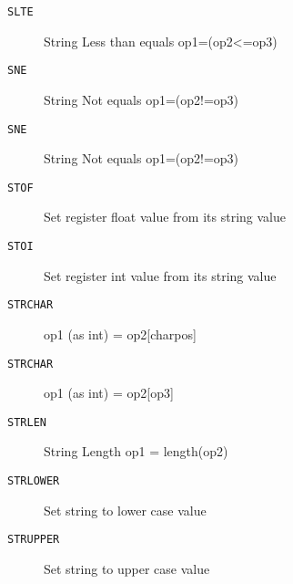 \begin{description}
\item[\texttt{SLTE}]  String Less than equals op1=(op2<=op3)\\

\end{description}
\begin{description}
\item[\texttt{SNE}]  String Not equals op1=(op2!=op3)\\

\end{description}
\begin{description}
\item[\texttt{SNE}]  String Not equals op1=(op2!=op3)\\

\end{description}
\begin{description}
\item[\texttt{STOF}]  Set register float value from its string value\\

\end{description}
\begin{description}
\item[\texttt{STOI}]  Set register int value from its string value\\

\end{description}
\begin{description}
\item[\texttt{STRCHAR}]  op1 (as int) = op2[charpos]\\

\end{description}
\begin{description}
\item[\texttt{STRCHAR}]  op1 (as int) = op2[op3]\\

\end{description}
\begin{description}
\item[\texttt{STRLEN}]  String Length op1 = length(op2)\\

\end{description}
\begin{description}
\item[\texttt{STRLOWER}]  Set string to lower case value\\

\end{description}
\begin{description}
\item[\texttt{STRUPPER}]  Set string to upper case value\\

\end{description}
